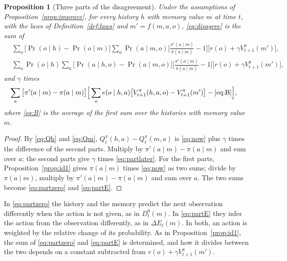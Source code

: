\documentclass{article}
\newtheorem{proposition}{Proposition}[section]
\theoremstyle{definition}
\newcommand{\dE}{\Delta E}
\begin{document}
\begin{proposition}[Three parts of the disagreement]\label{prop:threeparts}
Under the assumptions of Proposition~\ref{prop:improve}, for every history $h$ with memory value $m$ at time $t$, with the laws of Definition~\ref{def:laws} and $m'=f(m,a,o)$, \eqref{eq:disagree} is the sum of
\begin{align}
&\sum_o\big[\Pr(o\mid h)-\Pr(o\mid m)\big]\sum_a\Pr(a\mid m,o)\Big[\frac{\pi'(a\mid m)}{\pi(a\mid m)}-1\Big]\big[r(o)+\gamma V^\pi_{t+1}(m')\big], \label{eq:partzero}\\
&\sum_o\Pr(o\mid h)\sum_a\big[\Pr(a\mid h,o)-\Pr(a\mid m,o)\big]\Big[\frac{\pi'(a\mid m)}{\pi(a\mid m)}-1\Big]\big[r(o)+\gamma V^\pi_{t+1}(m')\big], \label{eq:partE}
\end{align}
and $\gamma$ times
\begin{equation}\label{eq:partlater}
\begin{aligned}
\sum_a\big[\pi'(a\mid m)-\pi(a\mid m)\big]\Big[&\sum_oe(o\mid h,a)\big[V^\pi_{t+1}(h,a,o)-V^\pi_{t+1}(m')\big]-\eqref{eq:B}\Big],
\end{aligned}
\end{equation}
where \eqref{eq:B} is the average of the first sum over the histories with memory value $m$.
\end{proposition}

\begin{proof}
By \eqref{eq:Qh} and \eqref{eq:Qm}, $Q^\pi_t(h,a)-Q^\pi_t(m,a)$ is \eqref{eq:now} plus $\gamma$ times the difference of the second parts. Multiply by $\pi'(a\mid m)-\pi(a\mid m)$ and sum over $a$: the second parts give $\gamma$ times \eqref{eq:partlater}. For the first parts, Proposition~\ref{prop:id1} gives $\pi(a\mid m)$ times \eqref{eq:now} as two sums; divide by $\pi(a\mid m)$, multiply by $\pi'(a\mid m)-\pi(a\mid m)$ and sum over $a$. The two sums become \eqref{eq:partzero} and \eqref{eq:partE}.
\end{proof}

In \eqref{eq:partzero} the history and the memory predict the next observation differently when the action is not given, as in $D^0_t(m)$. In \eqref{eq:partE} they infer the action from the observation differently, as in $\dE_t(m)$. In both, an action is weighted by the relative change of its probability. As in Proposition~\ref{prop:id1}, the sum of \eqref{eq:partzero} and \eqref{eq:partE} is determined, and how it divides between the two depends on a constant subtracted from $r(o)+\gamma V^\pi_{t+1}(m')$.
\end{document}
